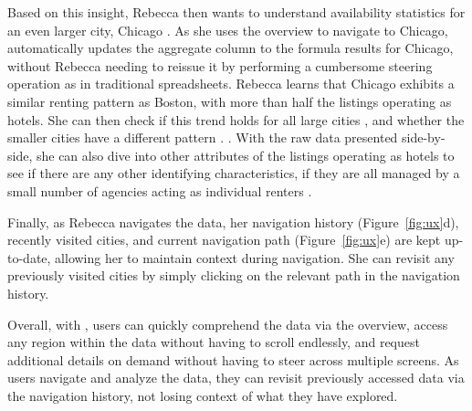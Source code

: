 Based on this insight, Rebecca then wants to
understand availability statistics for an even
larger city, Chicago .
As she uses the overview to navigate
to Chicago, \noah
automatically updates the aggregate column to
the  formula results for Chicago,
without Rebecca needing to reissue it by performing a cumbersome steering operation as in traditional spreadsheets. 
Rebecca learns that Chicago exhibits 
a similar renting pattern as Boston, with more than half the listings operating as hotels. She can then check if this trend holds for all large cities ,
and whether the smaller cities have a different pattern . . With the raw 
data presented side-by-side, she can also dive into other attributes
of the listings operating as hotels to see if there are any other identifying characteristics,
\eg if they are all managed by a small number of agencies acting as individual renters .

 Finally, as Rebecca navigates the data,
 her navigation history (Figure~\ref{fig:ux}d),
 \ie recently visited cities, and current navigation path
 (Figure~\ref{fig:ux}e) are kept up-to-date,
 allowing her to maintain context during navigation.
 She can revisit any previously visited cities
 by simply clicking on the relevant path
 in the navigation history.


Overall, with \noah, users can quickly
comprehend the data via the overview, access any region 
within the data without having to
scroll endlessly, and request additional details on demand without having to
steer across multiple screens. As users navigate and analyze the data, 
they can revisit previously accessed data via the navigation history, not losing context
of what they have explored. 





